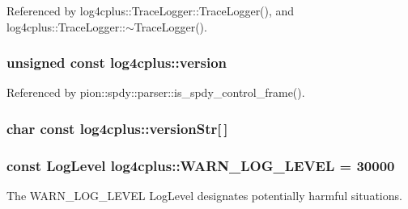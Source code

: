 Referenced by log4cplus\-::\-Trace\-Logger\-::\-Trace\-Logger(), and log4cplus\-::\-Trace\-Logger\-::$\sim$\-Trace\-Logger().

\hypertarget{namespacelog4cplus_ab24ccab21946beedb7469136999061f7}{
\subsubsection[{version}]{ unsigned const log4cplus\-::version}}\label{namespacelog4cplus_ab24ccab21946beedb7469136999061f7}


Referenced by pion\-::spdy\-::parser\-::is\-\_\-spdy\-\_\-control\-\_\-frame().

\hypertarget{namespacelog4cplus_aace8d70b258163ebbb3a5a1481a68a66}{
\subsubsection[{version\-Str}]{ char const log4cplus\-::version\-Str\mbox{[}$\,$\mbox{]}}}\label{namespacelog4cplus_aace8d70b258163ebbb3a5a1481a68a66}
\hypertarget{namespacelog4cplus_a042650a0a6fd89ef9b23c39185d438c9}{
\subsubsection[{W\-A\-R\-N\-\_\-\-L\-O\-G\-\_\-\-L\-E\-V\-E\-L}]{\setlength{\rightskip}{0pt plus 5cm}const {\bf Log\-Level} log4cplus\-::\-W\-A\-R\-N\-\_\-\-L\-O\-G\-\_\-\-L\-E\-V\-E\-L = 30000}}\label{namespacelog4cplus_a042650a0a6fd89ef9b23c39185d438c9}
The {\ttfamily W\-A\-R\-N\-\_\-\-L\-O\-G\-\_\-\-L\-E\-V\-E\-L} Log\-Level designates potentially harmful situations. 